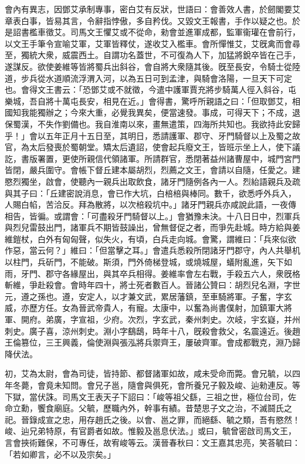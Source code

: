 \begin{pinyinscope}
會內有異志，因鄧艾承制專事，密白艾有反狀，世語曰：會善效人書，於劒閣要艾章表白事，皆易其言，令辭指悖傲，多自矜伐。又毀文王報書，手作以疑之也。於是詔書檻車徵艾。司馬文王懼艾或不從命，勑會並進軍成都，監軍衞瓘在會前行，以文王手筆令宣喻艾軍，艾軍皆釋仗，遂收艾入檻車。會所憚惟艾，艾旣禽而會尋至，獨統大衆，威震西土。自謂功名蓋世，不可復為人下，加猛將銳卒皆在己手，遂謀反。欲使姜維等皆將蜀兵出斜谷，會自將大衆隨其後。旣至長安，令騎士從陸道，步兵從水道順流浮渭入河，以為五日可到孟津，與騎會洛陽，一旦天下可定也。會得文王書云：「恐鄧艾或不就徵，今遣中護軍賈充將步騎萬人徑入斜谷，屯樂城，吾自將十萬屯長安，相見在近。」會得書，驚呼所親語之曰：「但取鄧艾，相國知我能獨辦之；今來大重，必覺我異矣，便當速發。事成，可得天下；不成，退保蜀漢，不失作劉備也。我自淮南以來，畫無遣策，四海所共知也。我欲持此安歸乎！」會以五年正月十五日至，其明日，悉請護軍、郡守、牙門騎督以上及蜀之故官，為太后發喪於蜀朝堂。矯太后遺詔，使會起兵廢文王，皆班示坐上人，使下議訖，書版署置，更使所親信代領諸軍。所請群官，悉閉著益州諸曹屋中，城門宮門皆閉，嚴兵圍守。會帳下督丘建本屬胡烈，烈薦之文王，會請以自隨，任愛之。建愍烈獨坐，啟會，使聽內一親兵出取飲食，諸牙門隨例各內一人。烈紿語親兵及疏與其子曰：「丘建密說消息，會已作大坑，白棓棓與棒同。數千，欲悉呼外兵入，人賜白㡊，苦洽反。拜為散將，以次棓殺坑中。」諸牙門親兵亦咸說此語，一夜傳相告，皆徧。或謂會：「可盡殺牙門騎督以上。」會猶豫未決。十八日日中，烈軍兵與烈兒雷鼓出門，諸軍兵不期皆鼓譟出，曾無督促之者，而爭先赴城。時方給與姜維鎧杖，白外有匈匈聲，似失火，有頃，白兵走向城。會驚，謂維曰：「兵來似欲作惡，當云何？」維曰：「但當擊之耳。」會遣兵悉殺所閉諸牙門郡守，內人共舉机以柱門，兵斫門，不能破。斯須，門外倚梯登城，或燒城屋，蟻附亂進，矢下如雨，牙門、郡守各緣屋出，與其卒兵相得。姜維率會左右戰，手殺五六人，衆旣格斬維，爭赴殺會。會時年四十，將士死者數百人。晉諸公贊曰：胡烈兒名淵，字世元，遵之孫也。遵，安定人，以才兼文武，累居藩鎮，至車騎將軍。子奮，字玄威，亦歷方任。女為晉武帝貴人，有寵。太康中，以奮為尚書僕射，加鎮軍大將軍、開府。弟廣，字宣祖，少府。次烈，字玄武，秦州刺史。次岐，宇玄嶷，并州刺史。廣子喜，涼州刺史。淵小字鷂鴟，時年十八，旣殺會救父，名震遠近。後趙王倫篡位，三王興義，倫使淵與張泓將兵禦齊王，屢破齊軍。會成都戰克，淵乃歸降伏法。

初，艾為太尉，會為司徒，皆持節、都督諸軍如故，咸未受命而斃。會兄毓，以四年冬薨，會竟未知問。會兄子邕，隨會與俱死，會所養兄子毅及峻、辿勑連反。等下獄，當伏誅。司馬文王表天子下詔曰：「峻等祖父繇，三祖之世，極位台司，佐命立勳，饗食廟庭。父毓，歷職內外，幹事有績。昔楚思子文之治，不滅鬪氏之祀。晉錄成宣之忠，用存趙氏之後。以會、邕之罪，而絕繇、毓之類，吾有愍然！峻、辿兄弟特原，有官爵者如故。惟毅及邕息伏法。」或曰，毓曾密啟司馬文王，言會挾術難保，不可專任，故宥峻等云。漢晉春秋曰：文王嘉其忠亮，笑荅毓曰：「若如卿言，必不以及宗矣。」


\end{pinyinscope}
